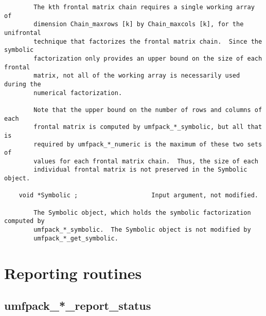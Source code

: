 {\begin{verbatim}
        The kth frontal matrix chain requires a single working array of
        dimension Chain_maxrows [k] by Chain_maxcols [k], for the unifrontal
        technique that factorizes the frontal matrix chain.  Since the symbolic
        factorization only provides an upper bound on the size of each frontal
        matrix, not all of the working array is necessarily used during the
        numerical factorization.

        Note that the upper bound on the number of rows and columns of each
        frontal matrix is computed by umfpack_*_symbolic, but all that is
        required by umfpack_*_numeric is the maximum of these two sets of
        values for each frontal matrix chain.  Thus, the size of each
        individual frontal matrix is not preserved in the Symbolic object.

    void *Symbolic ;                    Input argument, not modified.

        The Symbolic object, which holds the symbolic factorization computed by
        umfpack_*_symbolic.  The Symbolic object is not modified by
        umfpack_*_get_symbolic.
\end{verbatim}
}

\newpage
\section{Reporting routines}
\label{Report}

\subsection{umfpack\_*\_report\_status}

